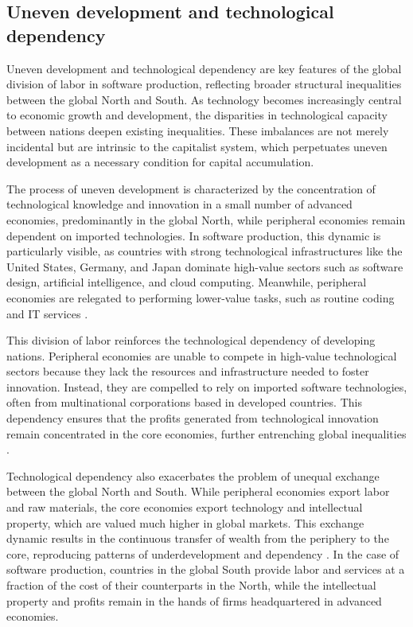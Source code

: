 \begin{refsection}
\subsection{Uneven development and technological dependency}

Uneven development and technological dependency are key features of the global division of labor in software production, reflecting broader structural inequalities between the global North and South. As technology becomes increasingly central to economic growth and development, the disparities in technological capacity between nations deepen existing inequalities. These imbalances are not merely incidental but are intrinsic to the capitalist system, which perpetuates uneven development as a necessary condition for capital accumulation.

The process of uneven development is characterized by the concentration of technological knowledge and innovation in a small number of advanced economies, predominantly in the global North, while peripheral economies remain dependent on imported technologies. In software production, this dynamic is particularly visible, as countries with strong technological infrastructures like the United States, Germany, and Japan dominate high-value sectors such as software design, artificial intelligence, and cloud computing. Meanwhile, peripheral economies are relegated to performing lower-value tasks, such as routine coding and IT services \cite[pp.~114-116]{smith2016}. 

This division of labor reinforces the technological dependency of developing nations. Peripheral economies are unable to compete in high-value technological sectors because they lack the resources and infrastructure needed to foster innovation. Instead, they are compelled to rely on imported software technologies, often from multinational corporations based in developed countries. This dependency ensures that the profits generated from technological innovation remain concentrated in the core economies, further entrenching global inequalities \cite[pp.~205-207]{mosco2009}.

Technological dependency also exacerbates the problem of unequal exchange between the global North and South. While peripheral economies export labor and raw materials, the core economies export technology and intellectual property, which are valued much higher in global markets. This exchange dynamic results in the continuous transfer of wealth from the periphery to the core, reproducing patterns of underdevelopment and dependency \cite[pp.~134-136]{sassen2008}. In the case of software production, countries in the global South provide labor and services at a fraction of the cost of their counterparts in the North, while the intellectual property and profits remain in the hands of firms headquartered in advanced economies.


\end{refsection}
